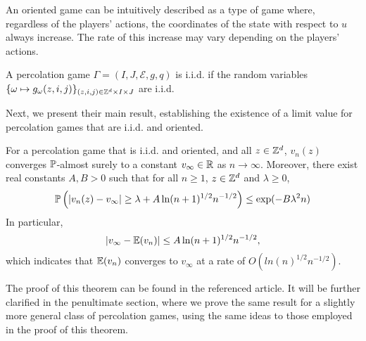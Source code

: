 	An oriented game can be intuitively described as a type of game where, regardless of the players' actions, the coordinates of the state with respect to $u$ always increase. The rate of this increase may vary depending on the players' actions.

	\begin{definition}
		A percolation game $\Gamma = (I, J, \mathcal{E}, g, q)$ is i.i.d. if the random variables $\{\omega \mapsto g_{\omega}(z, i, j)\}_{(z, i, j) \in \mathbb{Z}^d \times I \times J}$ are i.i.d.
	\end{definition}
	
 	
 	Next, we present their main result, establishing the existence of a limit value for percolation games that are i.i.d. and oriented.

	\begin{theorem}\label{theorem_iid_and_oriented_percolation_games}
		For a percolation game that is i.i.d. and oriented, and all $z \in \mathbb{Z}^d$, $v_n(z)$ converges $\mathbb{P}$-almost surely to a constant $v_{\infty} \in \mathbb{R}$ as $n \to \infty$. Moreover, there exist real constants $A, B > 0$ such that for all $n \geq 1$, $z \in \mathbb{Z}^d$ and $\lambda \geq 0$,
		\[
			\mathbb{P}\left(|v_n(z) - v_{\infty}| \geq \lambda + A\ln(n + 1)^{1/2}n^{-1/2} \right) \leq \exp(-B\lambda^2n)
		\]
		In particular, 
		\[
			|v_{\infty} - \mathbb{E}(v_n)| \leq A\ln(n + 1)^{1/2}n^{-1/2},
		\]
		which indicates that $\mathbb{E}(v_n)$ converges to $v_{\infty}$ at a rate of $O(ln(n)^{1/2}n^{-1/2})$.
	\end{theorem}

	The proof of this theorem can be found in the referenced article. It will be further clarified in the penultimate section, where we prove the same result for a slightly more general class of percolation games, using the same ideas to those employed in the proof of this theorem.


